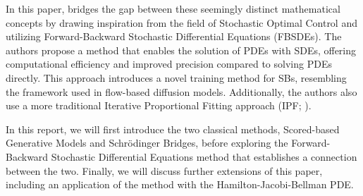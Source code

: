 \documentclass{article}
\begin{document}
In this paper, \cite{chen2023likelihood} bridges the gap between these seemingly distinct mathematical concepts by drawing inspiration from the field of Stochastic Optimal Control and utilizing Forward-Backward Stochastic Differential Equations (FBSDEs).
The authors propose a method that enables the solution of PDEs with SDEs, offering computational efficiency and improved precision compared to solving PDEs directly.
This approach introduces a novel training method for SBs, resembling the framework used in flow-based diffusion models.
Additionally, the authors also use a more traditional Iterative Proportional Fitting approach (IPF; \cite{kullback1968probability,debortoli2023diffusion}).

In this report, we will first introduce the two classical methods, Scored-based Generative Models and Schrödinger Bridges, before exploring the Forward-Backward Stochastic Differential Equations method that establishes a connection between the two.
Finally, we will discuss further extensions of this paper, including an application of the method with the Hamilton-Jacobi-Bellman PDE.



\end{document}
